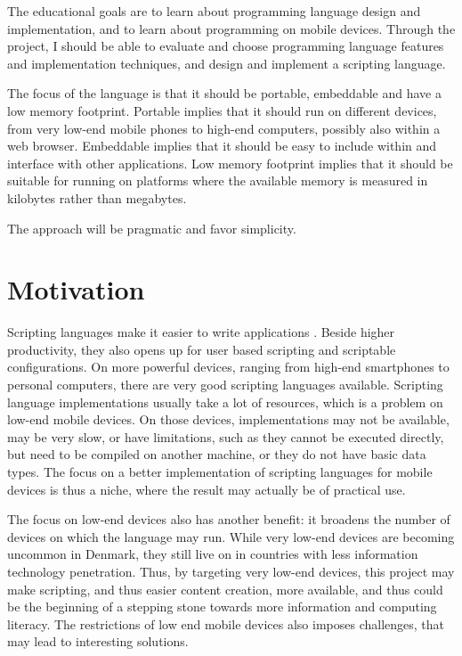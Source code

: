 \documentclass[11pt]{report}
\begin{document}
\begin{comment}
The motivation is that a scripting language makes it is easier to make applications for mobile 
devices, and that existing freely available scripting languages
are very limited, slow, or simply does not run on the low-end mobile devices.
\end{comment}

    The educational goals are to learn about programming language design and
implementation, and to learn about programming on mobile devices. Through the
project, I should be able to evaluate and choose programming language features
and implementation techniques, and design and implement a scripting language.

    The focus of the language is that it should be portable, embeddable and have
a low memory footprint. Portable implies that it should run on different devices,
from very low-end mobile phones to high-end computers, possibly also within a web browser. 
Embeddable implies that it should be easy to include within and interface with
other applications. Low memory footprint implies that it should be suitable for
running on platforms where the available memory is measured in kilobytes rather
than megabytes. 

    The approach will be pragmatic and favor simplicity.

\section{Motivation}

Scripting languages make it easier to write applications \cite{scripting-ousterhout}. Beside higher productivity, they also opens up for user based scripting and scriptable configurations.
On more powerful devices, ranging from high-end smartphones to personal computers, there are very good scripting languages available.
Scripting language implementations usually take a lot of resources, which is a problem on low-end mobile devices. On those devices, implementations may not be available, may be very slow, or have limitations, such as they cannot be executed directly, but need to be compiled on another machine, or they do not have basic data types.
The focus on a better implementation of scripting languages for mobile devices is thus a niche, where the result may actually be of practical use.

The focus on low-end devices also has another benefit:
it broadens the number of devices on which the language may run.
While very low-end devices are becoming uncommon in Denmark,
they still live on in countries with less information technology penetration.
Thus,  by targeting very low-end devices, 
this project may make scripting, and thus easier content creation,
more available,
and thus could be the beginning of a stepping stone 
towards more information and computing literacy.
The restrictions of low end mobile devices also imposes challenges, that may lead to interesting solutions.
\end{document}
